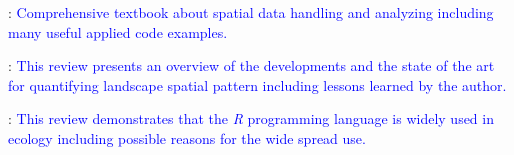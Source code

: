 \documentclass[smallextended]{svjour3}       %
\begin{document}
\noindent \textbullet \textbullet \cite{Lovelace2019}: \textcolor{blue}{Comprehensive textbook about spatial data handling and analyzing including many useful applied code examples.}

\noindent \textbullet \cite{Gustafson2019}: \textcolor{blue}{This review presents an overview of the developments and the state of the art for quantifying landscape spatial pattern including lessons learned by the author.}

\noindent \textbullet \cite{Lai2019}: \textcolor{blue}{This review demonstrates that the \textit{R} programming language is widely used in ecology including possible reasons for the wide spread use.}




\end{document}
